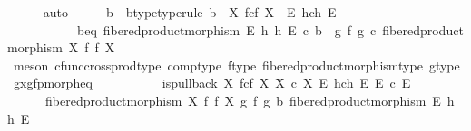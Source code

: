 \begin{isabellebody}
\ \ \ \ \isamarkupfalse%
\ auto\isanewline
\ \ \isamarkupfalse%
\ \isamarkupfalse%
\ b\ \ b{\isacharunderscore}{\kern0pt}type{\isacharbrackleft}{\kern0pt}type{\isacharunderscore}{\kern0pt}rule{\isacharbrackright}{\kern0pt}{\isacharcolon}{\kern0pt}\ {\isachardoublequoteopen}b\ {\isacharcolon}{\kern0pt}\ X\ \isactrlbsub f\isactrlesub {\isasymtimes}\isactrlsub c\isactrlbsub f\isactrlesub \ X\ {\isasymrightarrow}\ E\ \isactrlbsub h\isactrlesub {\isasymtimes}\isactrlsub c\isactrlbsub h\isactrlesub \ E{\isachardoublequoteclose}\isanewline
\ \ \ \ \ \ \ \ \ \ \ b{\isacharunderscore}{\kern0pt}eq{\isacharcolon}{\kern0pt}\ {\isachardoublequoteopen}fibered{\isacharunderscore}{\kern0pt}product{\isacharunderscore}{\kern0pt}morphism\ E\ h\ h\ E\ {\isasymcirc}\isactrlsub c\ b\ {\isacharequal}{\kern0pt}\ {\isacharparenleft}{\kern0pt}g\ {\isasymtimes}\isactrlsub f\ g{\isacharparenright}{\kern0pt}\ {\isasymcirc}\isactrlsub c\ fibered{\isacharunderscore}{\kern0pt}product{\isacharunderscore}{\kern0pt}morphism\ X\ f\ f\ X{\isachardoublequoteclose}\isanewline
\ \ \ \ \isamarkupfalse%
\ {\isacharparenleft}{\kern0pt}meson\ cfunc{\isacharunderscore}{\kern0pt}cross{\isacharunderscore}{\kern0pt}prod{\isacharunderscore}{\kern0pt}type\ comp{\isacharunderscore}{\kern0pt}type\ f{\isacharunderscore}{\kern0pt}type\ fibered{\isacharunderscore}{\kern0pt}product{\isacharunderscore}{\kern0pt}morphism{\isacharunderscore}{\kern0pt}type\ g{\isacharunderscore}{\kern0pt}type\ gxg{\isacharunderscore}{\kern0pt}fpmorph{\isacharunderscore}{\kern0pt}eq{\isacharparenright}{\kern0pt}\isanewline
\ \ \ \ \ \ \isanewline
\ \ \isamarkupfalse%
\ {\isachardoublequoteopen}is{\isacharunderscore}{\kern0pt}pullback\ {\isacharparenleft}{\kern0pt}X\ \isactrlbsub f\isactrlesub {\isasymtimes}\isactrlsub c\isactrlbsub f\isactrlesub \ X{\isacharparenright}{\kern0pt}\ {\isacharparenleft}{\kern0pt}X\ {\isasymtimes}\isactrlsub c\ X{\isacharparenright}{\kern0pt}\ {\isacharparenleft}{\kern0pt}E\ \isactrlbsub h\isactrlesub {\isasymtimes}\isactrlsub c\isactrlbsub h\isactrlesub \ E{\isacharparenright}{\kern0pt}\ {\isacharparenleft}{\kern0pt}E\ {\isasymtimes}\isactrlsub c\ E{\isacharparenright}{\kern0pt}\isanewline
\ \ \ \ \ \ {\isacharparenleft}{\kern0pt}fibered{\isacharunderscore}{\kern0pt}product{\isacharunderscore}{\kern0pt}morphism\ X\ f\ f\ X{\isacharparenright}{\kern0pt}\ {\isacharparenleft}{\kern0pt}g\ {\isasymtimes}\isactrlsub f\ g{\isacharparenright}{\kern0pt}\ b\ {\isacharparenleft}{\kern0pt}fibered{\isacharunderscore}{\kern0pt}product{\isacharunderscore}{\kern0pt}morphism\ E\ h\ h\ E{\isacharparenright}{\kern0pt}{\isachardoublequoteclose}\isanewline

\end{isabellebody}
